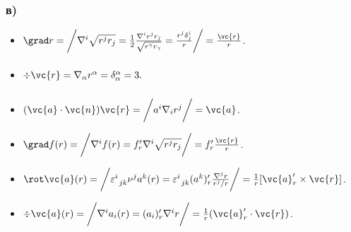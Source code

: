 \subsubsection*{в)}
	\begin{itemize}
		\item  $\grad r = \bigg\slash \nabla^i \sqrt{r^j r_j} = \frac{1}{2}\frac{\nabla^i r^j r_j}{\sqrt{r^\gamma r_\gamma}} = \frac{r^j \delta_{j}^{i}}{r} \bigg\slash = \frac{\vc{r}}{r}$.

		\item $\div \vc{r} = \nabla_\alpha r^\alpha = \delta_\alpha^\alpha = 3. \phantom{\bigg\slash} $

		\item $(\vc{a} \cdot \vc{n}) \vc{r}= \bigg\slash a^i \nabla_i r^j \bigg\slash = \vc{a}$.

		\item $\grad f (r) = \bigg\slash
		\nabla^i f(r) = f_r' \nabla^i \sqrt{r^j r_j}
		\bigg\slash = f_r' \frac{\vc{r}}{r}$.

		\item $\rot \vc{a}(r) = \bigg\slash \varepsilon_{\phantom{0} j k}^{i} \nu^j a^k(r) = \varepsilon_{\phantom{0} j k}^{i} (a^k)_r' \frac{\nabla^j r}{r^j/r} \bigg\slash = \frac{1}{r} [\vc{a}_r' \times \vc{r}]$.

		\item $\div \vc{a}(r) = \bigg\slash \nabla^i a_i(r) = (a_i)_r' \nabla^i r \bigg\slash = \frac{1}{r} (\vc{a}_r' \cdot \vc{r})$.
	\end{itemize}


